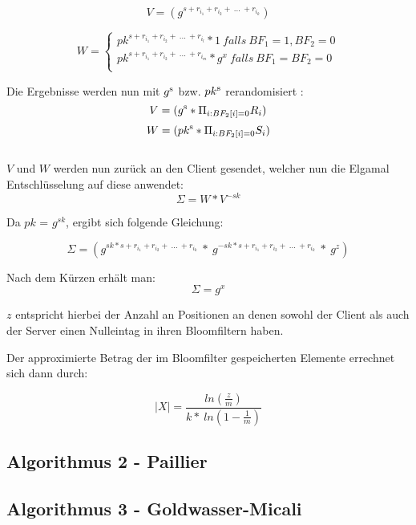 $$ V = (g^{s + r_{i_{1}} + r_{i_{2}} + \ ...\ +r_{i_{k}}})$$

\[
W =\left\{
\begin{array}{ll}
pk^{s + r_{i_{1}} + r_{i_{2}} + \ ...\ +r_{i_{l}}}*1 \ falls \ BF_{1} = 1,BF_{2} = 0 \\
pk^{s + r_{i_{1}} + r_{i_{2}} + \ ...\ +r_{i_{m}}}*g^{x} \ falls \ BF_{1} = BF_{2} = 0\\
\end{array}
\right.
\]

Die Ergebnisse werden nun mit $ g \textsuperscript{s}  $ bzw. $ pk \textsuperscript{s} $ rerandomisiert :
$$ V = (g \textsuperscript{s} * \Pi_{i:BF_{2}[i] = 0} R_{i} )$$
$$ W = (pk \textsuperscript{s} * \Pi_{i:BF_{2}[i] = 0} S_{i} )$$ \\
$ V $ und $ W $ werden nun zurück an den Client gesendet, welcher nun die Elgamal Entschlüsselung auf diese anwendet:
$$\Sigma = W * V^{-sk}$$

Da $pk$ = $g^{sk}$, ergibt sich folgende Gleichung:
	
$$\Sigma = (g^{sk * s + r_{i_{1}} + r_{i_{2}} + \ ...\ +r_{i_{k}}} \ * \ g^{-sk * s + r_{i_{1}} + r_{i_{2}} + \ ...\ +r_{i_{k}}} \ * \ g^z) $$


Nach dem Kürzen erhält man:
$$\Sigma = g^x$$

$ z $ entspricht hierbei der Anzahl  an Positionen an denen sowohl der Client als auch der Server einen Nulleintag in ihren Bloomfiltern haben.

Der approximierte Betrag der im Bloomfilter gespeicherten Elemente errechnet sich dann durch:

$$ |X| = \frac{ln( \frac{z}{m})}{k* \ ln(1- \frac{1}{m})}$$



\subsection{Algorithmus 2 - Paillier}
\label{sec:Sec2.3}




\subsection{Algorithmus 3 - Goldwasser-Micali}
\label{sec:Sec2.4}






